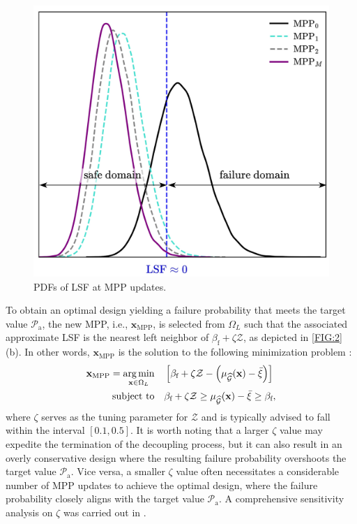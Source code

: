 \documentclass[preprint,3p]{elsarticle}
\begin{document}
\begin{linenumbers}
\begin{figure}
    \begin{center}
        \includegraphics[scale=0.85]{Fig3.jpg}
    \end{center}
    \caption{PDFs of LSF at MPP updates.}
    \label{FIG:3}
\end{figure}

To obtain an optimal design yielding a failure probability that meets the target value $\mathcal{P}_\text{a}$, the new MPP, i.e., $\textbf{x}_\text{MPP}$, is selected from $\Omega_L$ such that the associated approximate LSF is the nearest left neighbor of $\beta_\text{f}+\zeta\mathcal{Z}$, as depicted in \cref{FIG:2}(b).
In other words, $\textbf{x}_\text{MPP}$ is the solution to the following minimization problem \cite{VANHUYNH2023}:  
\begin{equation}
    \begin{aligned}
        \textbf{x}_\text{MPP} = \underset{\textbf{x}\in\Omega_L}{\text{arg\,min}} \quad & \left[\beta_\text{f}+\zeta\mathcal{Z}-\left(\mu_{\widehat{\mathcal{G}}}(\textbf{x}) -\bar\xi\right)\right]\\
        \text{subject to} \quad &
        \beta_\text{f}+\zeta\mathcal{Z} \geq \mu_{\widehat{\mathcal{G}}}(\textbf{x}) -\bar\xi \geq \beta_\text{f},
    \end{aligned}
    \label{EQ:25}
\end{equation}
where $\zeta$ serves as the tuning parameter for $\mathcal{Z}$ and is typically advised to fall within the interval $[0.1,0.5]$. It is worth noting that a larger $\zeta$ value may expedite the termination of the decoupling process, but it can also result in an overly conservative design where the resulting failure probability overshoots the target value $\mathcal{P}_\text{a}$. Vice versa, a smaller $\zeta$ value often necessitates a considerable number of MPP updates to achieve the optimal design, where the failure probability closely aligns with the target value $\mathcal{P}_\text{a}$. A comprehensive sensitivity analysis on $\zeta$ was carried out in \cite{VANHUYNH2023}.


\end{linenumbers}
\end{document}
